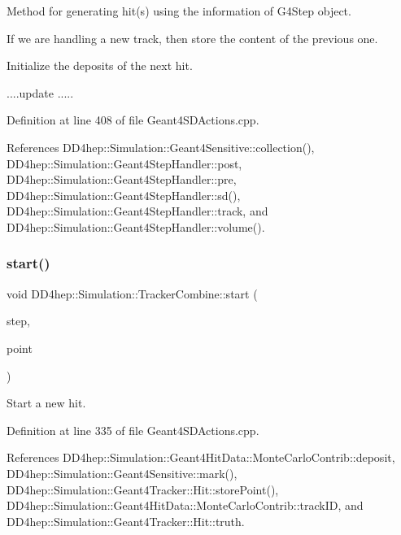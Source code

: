 Method for generating hit(s) using the information of G4\+Step object. 

If we are handling a new track, then store the content of the previous one.

Initialize the deposits of the next hit.

....update ..... 

Definition at line 408 of file Geant4\+S\+D\+Actions.\+cpp.



References D\+D4hep\+::\+Simulation\+::\+Geant4\+Sensitive\+::collection(), D\+D4hep\+::\+Simulation\+::\+Geant4\+Step\+Handler\+::post, D\+D4hep\+::\+Simulation\+::\+Geant4\+Step\+Handler\+::pre, D\+D4hep\+::\+Simulation\+::\+Geant4\+Step\+Handler\+::sd(), D\+D4hep\+::\+Simulation\+::\+Geant4\+Step\+Handler\+::track, and D\+D4hep\+::\+Simulation\+::\+Geant4\+Step\+Handler\+::volume().

\hypertarget{struct_d_d4hep_1_1_simulation_1_1_tracker_combine_a104188fb9a41662e03eacc2d34e4bced}{}\label{struct_d_d4hep_1_1_simulation_1_1_tracker_combine_a104188fb9a41662e03eacc2d34e4bced} 
\subsubsection{\texorpdfstring{start()}{start()}}
{\footnotesize\ttfamily void D\+D4hep\+::\+Simulation\+::\+Tracker\+Combine\+::start (\begin{DoxyParamCaption}\item[{G4\+Step $\ast$}]{step,  }\item[{G4\+Step\+Point $\ast$}]{point }\end{DoxyParamCaption})\hspace{0.3cm}{\ttfamily [inline]}}



Start a new hit. 



Definition at line 335 of file Geant4\+S\+D\+Actions.\+cpp.



References D\+D4hep\+::\+Simulation\+::\+Geant4\+Hit\+Data\+::\+Monte\+Carlo\+Contrib\+::deposit, D\+D4hep\+::\+Simulation\+::\+Geant4\+Sensitive\+::mark(), D\+D4hep\+::\+Simulation\+::\+Geant4\+Tracker\+::\+Hit\+::store\+Point(), D\+D4hep\+::\+Simulation\+::\+Geant4\+Hit\+Data\+::\+Monte\+Carlo\+Contrib\+::track\+ID, and D\+D4hep\+::\+Simulation\+::\+Geant4\+Tracker\+::\+Hit\+::truth.

